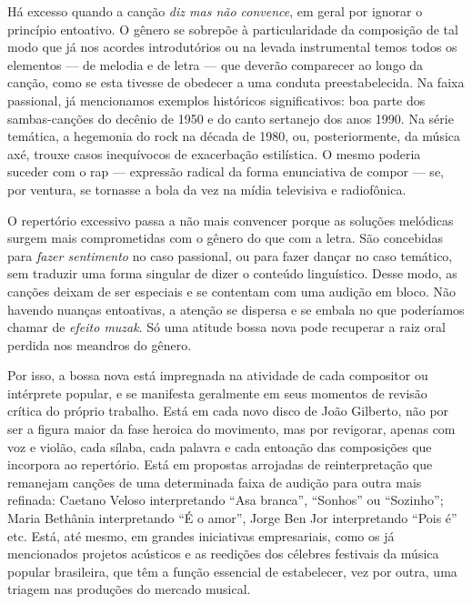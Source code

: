 Há excesso quando a canção \textit{diz mas não convence}, em geral por
ignorar o princípio entoativo. O gênero se sobrepõe à particularidade da
composição de tal modo que já nos acordes introdutórios ou na levada
instrumental temos todos os elementos --- de melodia e de letra --- que
deverão comparecer ao longo da canção, como se esta tivesse de obedecer
a uma conduta preestabelecida. Na faixa passional, já mencionamos
exemplos históricos significativos: boa parte dos sambas-canções do
decênio de 1950 e do canto sertanejo dos anos 1990. Na série temática, a
hegemonia do rock na década de 1980, ou, posteriormente, da música axé,
trouxe casos inequívocos de exacerbação estilística. O mesmo poderia
suceder com o rap --- expressão radical da forma enunciativa de compor
--- se, por ventura, se tornasse a bola da vez na mídia televisiva e
radiofônica.

O repertório excessivo passa a não mais convencer porque as soluções
melódicas surgem mais comprometidas com o gênero do que com a letra. São
concebidas para \textit{fazer sentimento} no caso passional, ou para fazer
dançar no caso temático, sem traduzir uma forma singular de dizer o
conteúdo linguístico. Desse modo, as canções deixam de ser especiais e
se contentam com uma audição em bloco. Não havendo nuanças entoativas, a
atenção se dispersa e se embala no que poderíamos chamar de \textit{efeito
muzak}. Só uma atitude bossa nova pode recuperar a raiz oral perdida nos
meandros do gênero.

Por isso, a bossa nova está impregnada na atividade de cada compositor
ou intérprete popular, e se manifesta geralmente em seus momentos de
revisão crítica do próprio trabalho. Está em cada novo disco de João
Gilberto, não por ser a figura maior da fase heroica do movimento, mas
por revigorar, apenas com voz e violão, cada sílaba, cada palavra e cada
entoação das composições que incorpora ao repertório. Está em propostas
arrojadas de reinterpretação que remanejam canções de uma determinada
faixa de audição para outra mais refinada: Caetano Veloso interpretando
``Asa branca'', ``Sonhos'' ou ``Sozinho''; Maria Bethânia interpretando
``É o amor'', Jorge Ben Jor interpretando ``Pois é'' etc. Está, até
mesmo, em grandes iniciativas empresariais, como os já mencionados
projetos acústicos e as reedições dos célebres festivais da música
popular brasileira, que têm a função essencial de estabelecer, vez por
outra, uma triagem nas produções do mercado musical.

